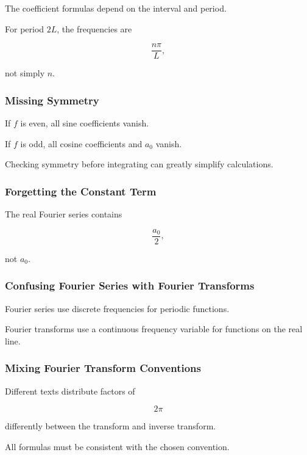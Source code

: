 The coefficient formulas depend on the interval and period.

For period \(2L\), the frequencies are

\[
\frac{n\pi}{L},
\]

not simply \(n\).

\subsubsection{Missing Symmetry}

If \(f\) is even, all sine coefficients vanish.

If \(f\) is odd, all cosine coefficients and \(a_0\) vanish.

Checking symmetry before integrating can greatly simplify calculations.

\subsubsection{Forgetting the Constant Term}

The real Fourier series contains

\[
\boxed{
\frac{a_0}{2},
}
\]

not \(a_0\).

\subsubsection{Confusing Fourier Series with Fourier Transforms}

Fourier series use discrete frequencies for periodic functions.

Fourier transforms use a continuous frequency variable for functions on
the real line.

\subsubsection{Mixing Fourier Transform Conventions}

Different texts distribute factors of

\[
2\pi
\]

differently between the transform and inverse transform.

All formulas must be consistent with the chosen convention.

